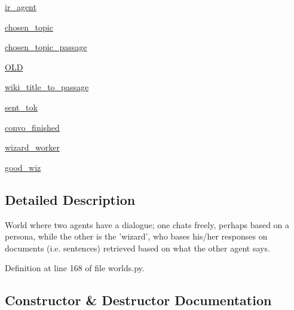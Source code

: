 \begin{DoxyCompactItemize}
\hyperlink{classworlds_1_1MTurkWizardOfWikipediaWorld_ade9f0ec53fc216d66d1028ddef048454}{ir\+\_\+agent}
\item 
\hyperlink{classworlds_1_1MTurkWizardOfWikipediaWorld_ab574cbcf9160080d5afa5742916f4cb3}{chosen\+\_\+topic}
\item 
\hyperlink{classworlds_1_1MTurkWizardOfWikipediaWorld_afd69124efd4b557e347d4fffc880f4b6}{chosen\+\_\+topic\+\_\+passage}
\item 
\hyperlink{classworlds_1_1MTurkWizardOfWikipediaWorld_aaba53793131eda8cc75a8fa35519152a}{O\+LD}
\item 
\hyperlink{classworlds_1_1MTurkWizardOfWikipediaWorld_aabcfa4f0477fd7f62392cb2ba91e0ed8}{wiki\+\_\+title\+\_\+to\+\_\+passage}
\item 
\hyperlink{classworlds_1_1MTurkWizardOfWikipediaWorld_a9dcd28ef1322d765f074004f05bf4e33}{sent\+\_\+tok}
\item 
\hyperlink{classworlds_1_1MTurkWizardOfWikipediaWorld_aa1c9b5b2238a556d6b5ee36f3cd6186d}{convo\+\_\+finished}
\item 
\hyperlink{classworlds_1_1MTurkWizardOfWikipediaWorld_aba0d79caf9c4fc54053aec059a3e1398}{wizard\+\_\+worker}
\item 
\hyperlink{classworlds_1_1MTurkWizardOfWikipediaWorld_a2c8a7347284827e281dccd9265c7eb3f}{good\+\_\+wiz}
\end{DoxyCompactItemize}


\subsection{Detailed Description}
\begin{DoxyVerb}World where two agents have a dialogue; one chats freely, perhaps based
    on a persona, while the other is the 'wizard', who bases his/her
    responses on documents (i.e. sentences) retrieved based on what the
    other agent says.
\end{DoxyVerb}
 

Definition at line 168 of file worlds.\+py.



\subsection{Constructor \& Destructor Documentation}
\mbox{\label{classworlds_1_1MTurkWizardOfWikipediaWorld_a63cc7094d112761f6f4b1d0e9450da65}} 
